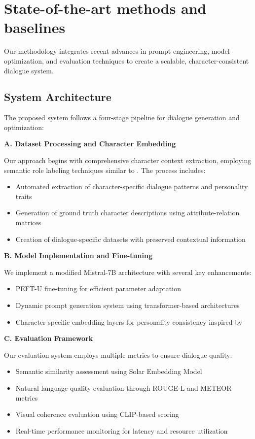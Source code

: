 \documentclass{article}
\begin{document}
\section{State-of-the-art methods and baselines}
Our methodology integrates recent advances in prompt engineering, model optimization, and evaluation techniques to create a scalable, character-consistent dialogue system.
\subsection{System Architecture}
The proposed system follows a four-stage pipeline for dialogue generation and optimization:

\textbf{A. Dataset Processing and Character Embedding}

Our approach begins with comprehensive character context extraction, employing semantic role labeling techniques similar to \cite{fan2023}. The process includes:
\begin{itemize}
\item Automated extraction of character-specific dialogue patterns and personality traits
\item Generation of ground truth character descriptions using attribute-relation matrices
\item Creation of dialogue-specific datasets with preserved contextual information
\end{itemize}

\textbf{B. Model Implementation and Fine-tuning}

We implement a modified Mistral-7B architecture with several key enhancements:
\begin{itemize}
\item PEFT-U fine-tuning \cite{clarke2024} for efficient parameter adaptation
\item Dynamic prompt generation system using transformer-based architectures
\item Character-specific embedding layers for personality consistency inspired by \cite{shao2023}
\end{itemize}

\textbf{C. Evaluation Framework}

Our evaluation system employs multiple metrics to ensure dialogue quality:
\begin{itemize}
\item Semantic similarity assessment using Solar Embedding Model
\item Natural language quality evaluation through ROUGE-L and METEOR metrics
\item Visual coherence evaluation using CLIP-based scoring
\item Real-time performance monitoring for latency and resource utilization
\end{itemize}
\end{document}
